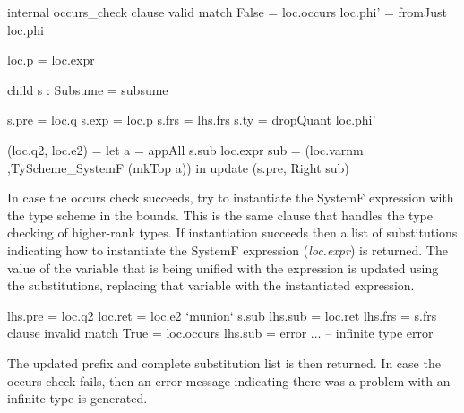 \begin{code}
internal occurs_check
  clause valid
    match False = loc.occurs
    loc.phi' = fromJust loc.phi
    
    loc.p = loc.expr
    
    child s : Subsume = subsume
    
    s.pre  = loc.q
    s.exp  = loc.p
    s.frs  = lhs.frs
    s.ty   = dropQuant loc.phi'
    
    (loc.q2, loc.e2) =  let  a    = appAll s.sub loc.expr
                             sub  =  (loc.varnm
                                     ,TyScheme_SystemF (mkTop a))
                        in update (s.pre, Right sub)
\end{code}
In case the occurs check succeeds, try to instantiate the SystemF expression with the type scheme in the bounds. This is the same clause that handles the type checking of higher-rank types. If instantiation succeeds then a list of substitutions indicating how to instantiate the SystemF expression (\emph{loc.expr}) is returned.
The value of the variable that is being unified with the expression is updated using the substitutions, replacing that variable with the instantiated expression.

\begin{code}
  lhs.pre  = loc.q2
  loc.ret  = loc.e2 `munion` s.sub
  lhs.sub  = loc.ret
  lhs.frs  = s.frs  
clause invalid
  match True  = loc.occurs
  lhs.sub     = error ... -- infinite type error
\end{code}
The updated prefix and complete substitution list is then returned. In case the occurs check fails, then an error message indicating there was a problem with an infinite type is generated.

